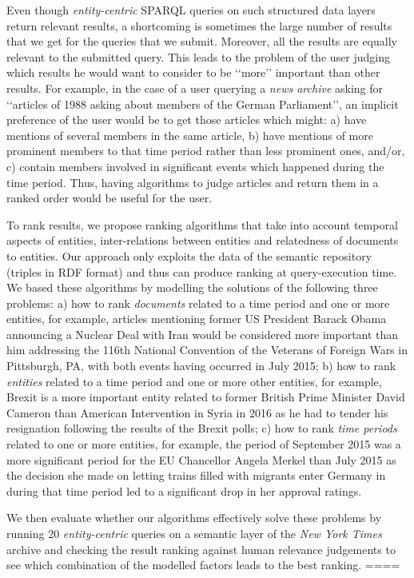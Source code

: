 \documentclass{libtex/llncs}
\newcommand{\q}[1]{\lq\lq{}{}#1\rq\rq{}{}}
\begin{document}
{    Even though {\em entity-centric} SPARQL queries on such structured data layers
    return relevant results, a shortcoming is sometimes the
    large number of results that we get for the
    queries that we submit. Moreover, all the
    results are equally relevant to the submitted query.
    This leads to the problem of the user judging which results he
    would want to consider to be \q{more} important than other results.
    For example, in the case of a user querying a {\em
    news archive} asking for \q{articles of 1988 asking about members of the German Parliament}, an implicit preference of
    the user would be to get those articles which might:
    a) have mentions of several members in the same article,
    b) have
    mentions of more prominent members to that time period rather than less prominent ones, and/or,
    c) contain members involved in significant events which happened during the time period.
    Thus, having algorithms to judge articles and return
    them in a ranked order would be useful for the user.


    To rank results, we propose ranking algorithms
    that take into account temporal aspects of entities, inter-relations
    between entities and relatedness of documents to entities.
    Our approach only exploits the data of the semantic repository
    (triples in RDF format) and thus
    can produce ranking at query-execution time.
    We based these algorithms by modelling the solutions of the
    following three problems:
    a) how to rank {\em documents} related to a time
    period and one or more entities,
    for example, articles mentioning former US President
    Barack Obama announcing a Nuclear Deal with Iran would be considered
    more important than him addressing the
    116th National Convention of the Veterans of Foreign Wars in Pittsburgh, PA,
    with both events having occurred in July 2015;
    b) how to rank {\em entities} related to a time period and one or more other
    entities, for example,
    Brexit is a more important entity related to former British Prime Minister David Cameron than American Intervention in Syria in 2016
    as he had to tender his resignation
    following the results of the Brexit polls;
    c) how to rank {\em time periods} related to one or more entities,
    for example, the period of September 2015 was a more
    significant period for the EU Chancellor Angela Merkel
    than July 2015 as the decision she made on letting trains filled with migrants enter Germany in during that time period led to a significant drop in her approval ratings\cite{merkel_rating}.


    We then evaluate whether our algorithms effectively solve these problems
    by running 20 {\em entity-centric} queries on a semantic layer of the {\em New York Times}
    archive and checking the result ranking against human relevance judgements to see which
    combination of the modelled factors leads to the best ranking.
====}
\end{document}
